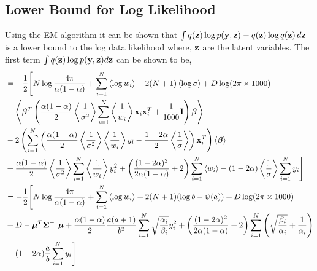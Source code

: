 \begin{appendices}
\subsection{Lower Bound for Log Likelihood}
\label{sec:l_bound}
Using the EM algorithm it can be shown that $\int q(\mathbf{z})\log p(\mathbf{y},\mathbf{z})-q(\mathbf{z})\log q(\mathbf{z})\,d\mathbf{z}$ is a lower bound to the log data likelihood where, $\mathbf{z}$ are the latent variables. The first term $\int q(\mathbf{z})\log p(\mathbf{y},\mathbf{z})d\mathbf{z}$ can be shown to be,
\begin{align}
\nonumber
&=-\frac{1}{2}\Biggl[N\log\frac{4\pi}{\alpha(1-\alpha)}+\sum_{i=1}^{N}\left\langle\log w_i\right\rangle +2(N+1)\left\langle\log\sigma\right\rangle+D\log (2\pi\times1000)\\
\nonumber&+\left\langle\bm{\beta}^T\left(\frac{\alpha(1-\alpha)}{2}\left\langle\frac{1}{\sigma^2}\right\rangle\sum_{i=1}^{N}\left\langle\frac{1}{w_i}\right\rangle\mathbf{x}_i\mathbf{x}_i^T+\frac{1}{1000}\mathbf{I}\right)\bm{\beta}\right\rangle\\
\nonumber
&-2\left(\sum_{i=1}^{N}\left(\frac{\alpha(1-\alpha)}{2}\left\langle\frac{1}{\sigma^2}\right\rangle\left\langle\frac{1}{w_i}\right\rangle y_i-\frac{1-2\alpha}{2}\left\langle\frac{1}{\sigma}\right\rangle\right)\mathbf{x}_i^T\right)\left\langle\bm{\beta}\right\rangle\\
\nonumber
&+\frac{\alpha(1-\alpha)}{2}\left\langle\frac{1}{\sigma^2}\right\rangle\sum_{i=1}^{N}\left\langle\frac{1}{w_i}\right\rangle y_i^2+\left(\frac{(1-2\alpha)^2}{2\alpha(1-\alpha)}+2\right)\sum_{i=1}^{N}\left\langle w_i\right\rangle-(1-2\alpha)\left\langle\frac{1}{\sigma}\right\rangle\sum_{i=1}^{N} y_i\Biggr]\\
\nonumber&=-\frac{1}{2}\Biggl[N\log\frac{4\pi}{\alpha(1-\alpha)}+\sum_{i=1}^{N}\left\langle\log w_i\right\rangle +2(N+1)(\log b -\psi(a))+D\log (2\pi\times1000)\\
\nonumber&+D-{\boldsymbol{\mu}}^T{\mathbf{\Sigma}}^{-1}{\boldsymbol{\mu}}+\frac{\alpha(1-\alpha)}{2}\frac{a(a+1)}{b^2}\sum_{i=1}^{N}\sqrt{\frac{\alpha_i}{\beta_i}}y_i^2+\left(\frac{(1-2\alpha)^2}{2\alpha(1-\alpha)}+2\right)\sum_{i=1}^{N}\left(\sqrt{\frac{\beta_i}{\alpha_i}}+\frac{1}{\alpha_i}\right)\\
&-(1-2\alpha)\frac{a}{b}\sum_{i=1}^{N} y_i\Biggr]
\end{align}


\end{appendices}
